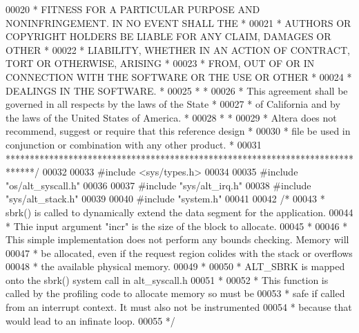 \begin{DoxyCode}
00020 \textcolor{comment}{* FITNESS FOR A PARTICULAR PURPOSE AND NONINFRINGEMENT. IN NO EVENT SHALL THE *}
00021 \textcolor{comment}{* AUTHORS OR COPYRIGHT HOLDERS BE LIABLE FOR ANY CLAIM, DAMAGES OR OTHER      *}
00022 \textcolor{comment}{* LIABILITY, WHETHER IN AN ACTION OF CONTRACT, TORT OR OTHERWISE, ARISING     *}
00023 \textcolor{comment}{* FROM, OUT OF OR IN CONNECTION WITH THE SOFTWARE OR THE USE OR OTHER         *}
00024 \textcolor{comment}{* DEALINGS IN THE SOFTWARE.                                                   *}
00025 \textcolor{comment}{*                                                                             *}
00026 \textcolor{comment}{* This agreement shall be governed in all respects by the laws of the State   *}
00027 \textcolor{comment}{* of California and by the laws of the United States of America.              *}
00028 \textcolor{comment}{*                                                                             *}
00029 \textcolor{comment}{* Altera does not recommend, suggest or require that this reference design    *}
00030 \textcolor{comment}{* file be used in conjunction or combination with any other product.          *}
00031 \textcolor{comment}{******************************************************************************/}
00032 
00033 \textcolor{preprocessor}{#include <sys/types.h>}
00034 
00035 \textcolor{preprocessor}{#include "os/alt_syscall.h"}
00036 
00037 \textcolor{preprocessor}{#include "sys/alt_irq.h"}
00038 \textcolor{preprocessor}{#include "sys/alt_stack.h"}
00039 
00040 \textcolor{preprocessor}{#include "system.h"}
00041 
00042 \textcolor{comment}{/*}
00043 \textcolor{comment}{ * sbrk() is called to dynamically extend the data segment for the application.}
00044 \textcolor{comment}{ * Thie input argument "incr" is the size of the block to allocate.}
00045 \textcolor{comment}{ *}
00046 \textcolor{comment}{ * This simple implementation does not perform any bounds checking. Memory will}
00047 \textcolor{comment}{ * be allocated, even if the request region colides with the stack or overflows}
00048 \textcolor{comment}{ * the available physical memory. }
00049 \textcolor{comment}{ *}
00050 \textcolor{comment}{ * ALT\_SBRK is mapped onto the sbrk() system call in alt\_syscall.h}
00051 \textcolor{comment}{ *}
00052 \textcolor{comment}{ * This function is called by the profiling code to allocate memory so must be}
00053 \textcolor{comment}{ * safe if called from an interrupt context.  It must also not be instrumented}
00054 \textcolor{comment}{ * because that would lead to an infinate loop.}
00055 \textcolor{comment}{ */}

\end{DoxyCode}
